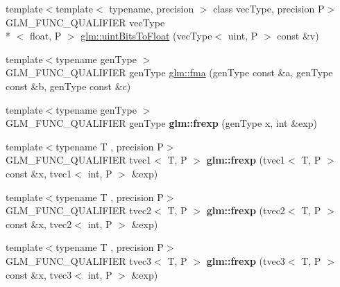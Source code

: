 \begin{DoxyCompactItemize}
\item 
{\footnotesize template$<$template$<$ typename, precision $>$ class vec\-Type, precision P$>$ }\\G\-L\-M\-\_\-\-F\-U\-N\-C\-\_\-\-Q\-U\-A\-L\-I\-F\-I\-E\-R vec\-Type\\*
$<$ float, P $>$ \hyperlink{group__core__func__common_ga3acab37650ecd792dc84548094b58684}{glm\-::uint\-Bits\-To\-Float} (vec\-Type$<$ uint, P $>$ const \&v)
\item 
{\footnotesize template$<$typename gen\-Type $>$ }\\G\-L\-M\-\_\-\-F\-U\-N\-C\-\_\-\-Q\-U\-A\-L\-I\-F\-I\-E\-R gen\-Type \hyperlink{group__core__func__common_gad0f444d4b81cc53c3b6edf5aa25078c2}{glm\-::fma} (gen\-Type const \&a, gen\-Type const \&b, gen\-Type const \&c)
\item 
\hypertarget{namespaceglm_a90f422cea9e6e5c383bb69b593434c97}{{\footnotesize template$<$typename gen\-Type $>$ }\\G\-L\-M\-\_\-\-F\-U\-N\-C\-\_\-\-Q\-U\-A\-L\-I\-F\-I\-E\-R gen\-Type {\bfseries glm\-::frexp} (gen\-Type x, int \&exp)}\label{namespaceglm_a90f422cea9e6e5c383bb69b593434c97}

\item 
\hypertarget{namespaceglm_ae456a3da34aba807bf8e621573333e65}{{\footnotesize template$<$typename T , precision P$>$ }\\G\-L\-M\-\_\-\-F\-U\-N\-C\-\_\-\-Q\-U\-A\-L\-I\-F\-I\-E\-R tvec1$<$ T, P $>$ {\bfseries glm\-::frexp} (tvec1$<$ T, P $>$ const \&x, tvec1$<$ int, P $>$ \&exp)}\label{namespaceglm_ae456a3da34aba807bf8e621573333e65}

\item 
\hypertarget{namespaceglm_a0b0055e3fc459db5c3b7fa4acda93487}{{\footnotesize template$<$typename T , precision P$>$ }\\G\-L\-M\-\_\-\-F\-U\-N\-C\-\_\-\-Q\-U\-A\-L\-I\-F\-I\-E\-R tvec2$<$ T, P $>$ {\bfseries glm\-::frexp} (tvec2$<$ T, P $>$ const \&x, tvec2$<$ int, P $>$ \&exp)}\label{namespaceglm_a0b0055e3fc459db5c3b7fa4acda93487}

\item 
\hypertarget{namespaceglm_a2c2633f38fb9ba15eb5af40010b4fd93}{{\footnotesize template$<$typename T , precision P$>$ }\\G\-L\-M\-\_\-\-F\-U\-N\-C\-\_\-\-Q\-U\-A\-L\-I\-F\-I\-E\-R tvec3$<$ T, P $>$ {\bfseries glm\-::frexp} (tvec3$<$ T, P $>$ const \&x, tvec3$<$ int, P $>$ \&exp)}\label{namespaceglm_a2c2633f38fb9ba15eb5af40010b4fd93}


\end{DoxyCompactItemize}
